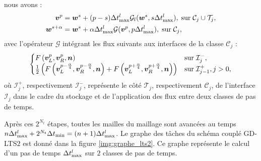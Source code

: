 nous avons :
\begin{equation}
	\begin{aligned}
		\bm{v}^p &= 
			\bm{w}^s + (p-s) \Delta t^l_{\max}
			\mathcal{G}_l(\bm{w}^s , s \Delta t^l_{\max}) ,
			\; \mathrm{sur} \; \mathcal{C}_j \cup \mathcal{T}_j , \\
		\bm{w}^{s + \alpha} &=
			\bm{w}^s + \alpha \Delta t^l_{\max}
			\mathcal{G}(\bm{v}^p , p \Delta t^l_{\max}) ,
			\; \mathrm{sur} \; \mathcal{C}_j ,
		\label{eq:methode_locale}
	\end{aligned}
\end{equation}
avec l'opérateur $\mathcal{G}$ intégrant les flux suivants aux interfaces
de la classe $\mathcal{C}_j$ :
\begin{align}
	\begin{cases}
		F\left(\bm{v}_L^p,\bm{v}_R^p,\bm{n}\right) &
			\mathrm{sur} \; \mathcal{I}_j^{-} , \\
		\frac{1}{2} \left( F\left(\bm{v}_L^{p-\frac{\alpha}{4}},\bm{v}_R^{p-\frac{\alpha}{4}},\bm{n}\right) + F\left(\bm{v}_L^{p+\frac{\alpha}{4}},\bm{v}_R^{p+\frac{\alpha}{4}},\bm{n}\right) \right) &
			\mathrm{sur} \; \mathcal{I}_{j-1}^{+} , j > 0 ,
	\end{cases}
\end{align}
où $\mathcal{I}_j^{+}$, respectivement $\mathcal{I}_j^{-}$, représente
le côté $\mathcal{T}_j$, respectivement $\mathcal{C}_j$, de l'interface
$\mathcal{I}_j$ dans le cadre du stockage et de l'application des flux
entre deux classes de pas de temps.

Après ces $2^{N_t}$ étapes, toutes les mailles du maillage sont avancées au temps
$n \Delta t^l_{\max} + 2^{N_t} \Delta t_{\min} = (n+1) \Delta t^l_{\max}$.
Le graphe des tâches du schéma couplé GD-LTS$2$ est donné dans la figure \ref{img:graphe_lts2}. Ce graphe représente le calcul d'un pas de
temps $\Delta t^l_{\max}$ sur $2$ classes de pas de temps.
\\


